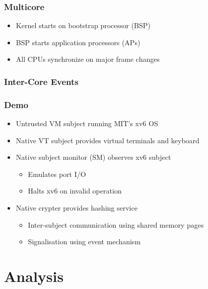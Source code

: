 \documentclass[xcolor={dvipsnames}]{beamer}
\begin{document}
\begin{frame}\frametitle{Multicore}
\begin{itemize}
	\item Kernel starts on bootstrap processor (BSP)
	\item BSP starts application processors (APs)
	\item All CPUs synchronize on major frame changes
\end{itemize}
\begin{center}
	
\end{center}
\end{frame}

\begin{frame}\frametitle{Inter-Core Events}
\begin{center}
	
\end{center}
\end{frame}

\begin{frame}\frametitle{Demo}
\begin{itemize}
	\item Untrusted VM subject running MIT's xv6 OS
	\item Native VT subject provides virtual terminals and keyboard
	\item Native subject monitor (SM) observes xv6 subject
	\begin{itemize}
		\item Emulates port I/O
		\item Halts xv6 on invalid operation
	\end{itemize}
	\item Native crypter provides hashing service
	\begin{itemize}
		\item Inter-subject communication using shared memory pages
		\item Signalisation using event mechanism
	\end{itemize}
\end{itemize}
\begin{center}
	
\end{center}
\end{frame}

\section{Analysis}
\end{document}

